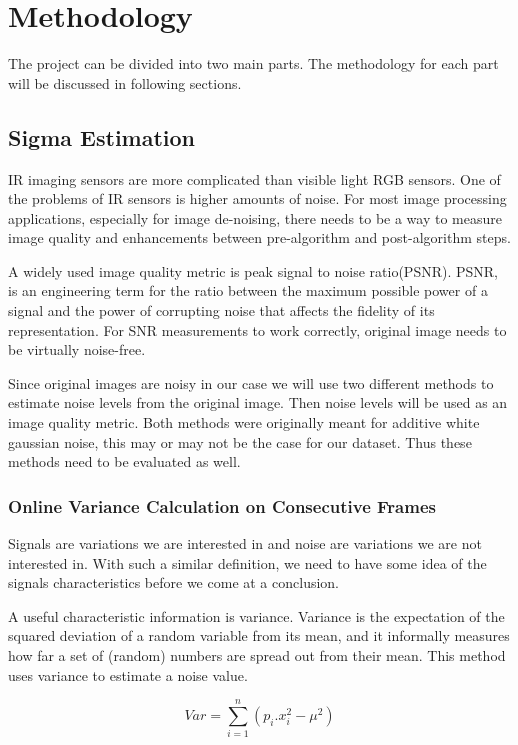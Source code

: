 \documentclass[10pt,twocolumn,letterpaper]{article}
\begin{document}
\section{Methodology}
The project can be divided into two main parts. The methodology for each part will be discussed in following sections.

\subsection{Sigma Estimation}
IR imaging sensors are more complicated than visible light RGB sensors. One of the problems of IR sensors is higher amounts of noise.
For most image processing applications, especially for image de-noising, there needs to be a way to measure image quality and enhancements between pre-algorithm and post-algorithm steps.

A widely used image quality metric is peak signal to noise ratio(PSNR). PSNR, is an engineering term for the ratio between the maximum possible power of a signal and the power of corrupting noise that affects the fidelity of its representation\cite{wiki:psnr}. For SNR measurements to work correctly, original image needs to be virtually noise-free.

Since original images are noisy in our case we will use two different methods to estimate noise levels from the original image. Then noise levels will be used as an image quality metric. Both methods were originally meant for additive white gaussian noise, this may or may not be the case for our dataset. Thus these methods need to be evaluated as well.
\subsubsection{Online Variance Calculation on Consecutive Frames} \label{ss:online-var}
Signals are variations we are interested in and noise are variations we are not interested in. With such a similar definition, we need to have some idea of the signals characteristics before we come at a conclusion. 

A useful characteristic information is variance. Variance is the expectation of the squared deviation of a random variable from its mean, and it informally measures how far a set of (random) numbers are spread out from their mean\cite{wiki:variance}. This method uses variance to estimate a noise value.

\begin{displaymath}
Var = \sum_{i=1}^{n} (p_i.x^2_i - \mu^2)
\end{displaymath}\label{eq:disc-var}
\end{document}
